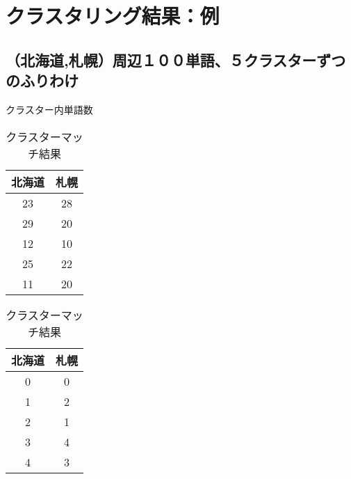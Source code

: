 \chapter{クラスタリング結果：例}
\label{app_b}
\section{（北海道,札幌）周辺１００単語、５クラスターずつのふりわけ}
\begin{table}[h]
  \begin{minipage}[t]{.45\textwidth}
    \begin{center}
      \caption[]{クラスター内単語数}
      \label{hs100_5}
      \begin{tabular}{|c||c|} \hline
        北海道 & 札幌 \\ \hline \hline
        23 & 28 \\
        29 & 20 \\
        12 & 10 \\
        25 & 22 \\
        11 & 20 \\ \hline
      \end{tabular}
    \end{center}
  \end{minipage}
  \hfill
  \begin{minipage}[t]{.45\textwidth}
    \begin{center}
      \caption[]{クラスターマッチ結果}
      \label{hs100_5match}
      \begin{tabular}{|c||c|} \hline
        北海道 & 札幌 \\ \hline \hline
        0 & 0 \\
        1 & 2 \\
        2 & 1 \\
        3 & 4 \\
        4 & 3 \\ \hline
      \end{tabular}
    \end{center}
  \end{minipage}
\end{table}

